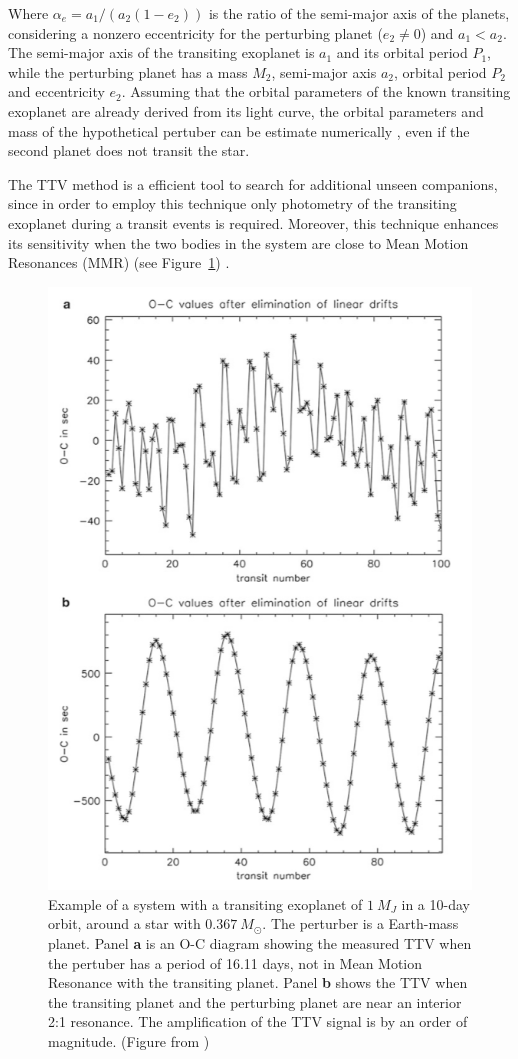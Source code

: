 Where $\alpha_e = a_1/(a_2(1-e_2))$ is the ratio of the semi-major axis of the planets, considering a nonzero eccentricity for the perturbing planet ($e_2 \neq 0$) and $a_1 < a_2$. The semi-major axis of the transiting exoplanet is $a_1$ and its orbital period $P_1$, while the perturbing planet has a mass $M_2$, semi-major axis $a_2$, orbital period $P_2$ and eccentricity $e_2$. Assuming that the orbital parameters of the known transiting exoplanet are already derived from its light curve, the orbital parameters and mass of the hypothetical pertuber can be estimate numerically \citep{Nesvorny2008,Nesvorny2009}, even if the second planet does not transit the star. 

The TTV method is a efficient tool to search for additional unseen companions, since in order to employ this technique only photometry of the transiting exoplanet during a transit events is required. Moreover, this technique enhances its sensitivity when the two bodies in the system are close to Mean Motion Resonances (MMR) \citep{Agol2005,Steffen2005,Agol2007} (see Figure~\ref{rms_ttv_amplitude}) . 

\begin{figure}
\centering
\includegraphics[width=0.6\columnwidth]{imagenes/rms_ttv_amplitude}
\caption{Example of a system with a transiting exoplanet of $1~M_{J}$ in a 10-day orbit, around a star with $0.367~M_{\odot}$. The perturber is a Earth-mass planet. Panel \textbf{a} is an O-C diagram showing the measured TTV when the pertuber has a period of 16.11 days, not in Mean Motion Resonance with the transiting planet. Panel \textbf{b} shows the TTV when the transiting planet and the perturbing planet are near an interior 2:1 resonance. The amplification of the TTV signal is by an order of magnitude. (Figure from \cite{Haghighipour2011})}
\label{rms_ttv_amplitude}
\end{figure}

